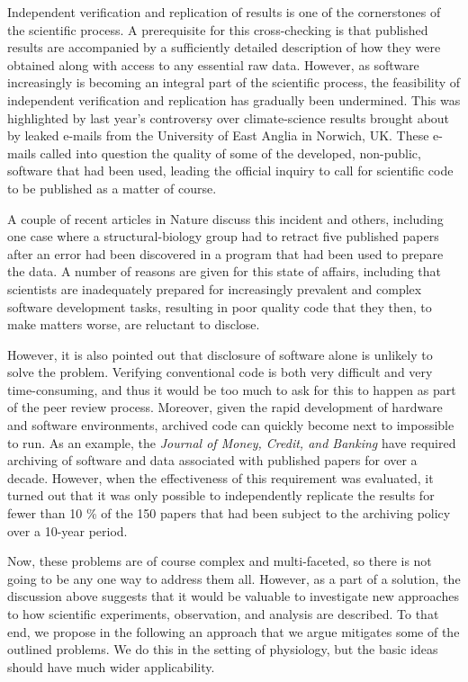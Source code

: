 Independent verification and replication of results is one of the cornerstones
of the scientific process. A prerequisite for this cross-checking is that
published results are accompanied by a sufficiently detailed description of
how they were obtained along with access to any essential raw data. However,
as software increasingly is becoming an integral part of the scientific
process, the feasibility of independent verification and replication has
gradually been undermined. This was highlighted by last year's controversy
over climate-science results brought about by leaked e-mails from the
University of East Anglia in Norwich, UK. These e-mails called into question
the quality of some of the developed, non-public, software that had been used,
leading the official inquiry to call for scientific code to be published
as a matter of course.

A couple of recent articles in Nature \cite{XXX} discuss this incident 
and others, including one case where a structural-biology group had to
retract five published papers after an error had been discovered in a program
that had been used to prepare the data. A number of reasons are given for
this state of affairs, including that scientists are inadequately prepared for
increasingly prevalent and complex software development tasks, resulting
in poor quality code that they then, to make matters worse, are reluctant to
disclose.

However, it is also pointed out that disclosure of software alone is unlikely
to solve the problem. Verifying conventional code is both very difficult and
very time-consuming, and thus it would be too much to ask for this to happen
as part of the peer review process. Moreover, given the rapid development of
hardware and software environments, archived code can quickly become next to
impossible to run. As an example, the \textit{Journal of Money, Credit, and
Banking} have required archiving of software and data associated with
published papers for over a decade. However, when the effectiveness of this
requirement was evaluated, it turned out that it was only possible to
independently replicate the results for fewer than 10 \% of the 150 papers
that had been subject to the archiving policy over a 10-year period.

Now, these problems are of course complex and multi-faceted, so there is not
going to be any one way to address them all. However, as a part of a solution,
the discussion above suggests that it would be valuable to investigate new
approaches to how scientific experiments, observation, and analysis are
described. To that end, we propose in the following an approach that we argue
mitigates some of the outlined problems. We do this in the setting of
physiology, but the basic ideas should have much wider applicability.

